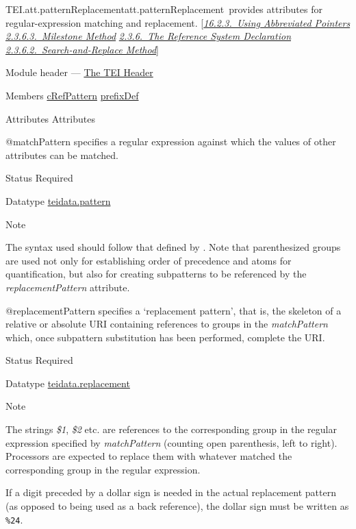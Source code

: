 \begin{reflist}
\item[]\begin{specHead}{TEI.att.patternReplacement}{att.patternReplacement} provides attributes for regular-expression matching and replacement. [\textit{\hyperref[SAPU]{16.2.3.\ Using Abbreviated Pointers}} \textit{\hyperref[HD54M]{2.3.6.3.\ Milestone Method}} \textit{\hyperref[HD54]{2.3.6.\ The Reference System Declaration}} \textit{\hyperref[HD54S]{2.3.6.2.\ Search-and-Replace Method}}]\end{specHead} 
    \item[{Module}]
  header — \hyperref[HD]{The TEI Header}
    \item[{Members}]
  \hyperref[TEI.cRefPattern]{cRefPattern} \hyperref[TEI.prefixDef]{prefixDef}
    \item[{Attributes}]
  Attributes\hfil\\[-10pt]\begin{sansreflist}
    \item[@matchPattern]
  specifies a regular expression against which the values of other attributes can be matched.
\begin{reflist}
    \item[{Status}]
  Required
    \item[{Datatype}]
  \hyperref[TEI.teidata.pattern]{teidata.pattern}
    \item[{Note}]
  \par
The syntax used should follow that defined by . Note that parenthesized groups are used not only for establishing order of precedence and atoms for quantification, but also for creating subpatterns to be referenced by the {\itshape replacementPattern} attribute.
\end{reflist}  
    \item[@replacementPattern]
  specifies a ‘replacement pattern’, that is, the skeleton of a relative or absolute URI containing references to groups in the {\itshape matchPattern} which, once subpattern substitution has been performed, complete the URI.
\begin{reflist}
    \item[{Status}]
  Required
    \item[{Datatype}]
  \hyperref[TEI.teidata.replacement]{teidata.replacement}
    \item[{Note}]
  \par
The strings \textit{\$1}, \textit{\$2} etc. are references to the corresponding group in the regular expression specified by {\itshape matchPattern} (counting open parenthesis, left to right). Processors are expected to replace them with whatever matched the corresponding group in the regular expression.\par
If a digit preceded by a dollar sign is needed in the actual replacement pattern (as opposed to being used as a back reference), the dollar sign must be written as \texttt{\%24}.
\end{reflist}  
\end{sansreflist}  
\end{reflist}  
